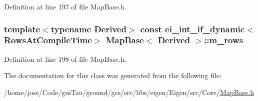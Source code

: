 Definition at line 197 of file Map\-Base.\-h.

\hypertarget{class_map_base_a9c146d4de664cdd69bfa8f464ea82ef1}{
\subsubsection[{m\-\_\-rows}]{\setlength{\rightskip}{0pt plus 5cm}template$<$typename Derived$>$ const ei\-\_\-int\-\_\-if\-\_\-dynamic$<${\bf Rows\-At\-Compile\-Time}$>$ {\bf Map\-Base}$<$ Derived $>$\-::m\-\_\-rows\hspace{0.3cm}{\ttfamily [protected]}}}\label{class_map_base_a9c146d4de664cdd69bfa8f464ea82ef1}


Definition at line 198 of file Map\-Base.\-h.



The documentation for this class was generated from the following file\-:\begin{DoxyCompactItemize}
\item 
/home/jose/\-Code/gui\-Tau/ground/gcs/src/libs/eigen/\-Eigen/src/\-Core/\hyperlink{_map_base_8h}{Map\-Base.\-h}\end{DoxyCompactItemize}
